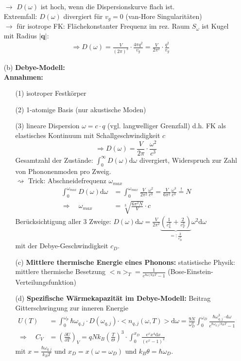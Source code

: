 \begin{itemize}
$\rightarrow$ $D(\omega)$ ist hoch, wenn die Dispersionskurve flach ist.\\
Extremfall: $D(\omega)$ divergiert für $v_g = 0$ (van-Hore Singularitäten)\\
$\rightarrow$ für isotrope FK: Flächekonstanter Frequenz im rez. Raum $S_{\omega}$ ist Kugel mit Radius $|\textbf{q}|$:
\begin{align}
	\Rightarrow D(\omega) = \frac{V}{(2\pi)^3} \cdot \frac{4\pi q^2}{v_g} = \frac{V}{2\pi^2} \cdot \frac{q^2}{v_g}
\end{align}
\item[(b)] \textbf{Debye-Modell:}\\
\textbf{Annahmen:} \begin{itemize}
	\item[(1)] isotroper Festkörper
	\item[(2)] 1-atomige Basis (nur akustische Moden)
	\item[(3)] lineare Dispersion $\omega = c \cdot q$ (vgl. langwelliger Grenzfall) d.h. FK als elastisches Kontinuum mit Schallgeschwindigkeit $c$
	$$\Rightarrow D(\omega) = \frac{V}{2 \pi} \cdot \frac{\omega^2}{c^3}$$
	Gesamtzahl der Zustände: $\int_0^\infty D(\omega)\mathrm{d}\omega$ divergiert, Widerspruch zur Zahl von Phononenmoden pro Zweig. \\
	$\rightsquigarrow$ Trick: Abschneidefrequenz $\omega_{max}$\\
	\begin{align*}
		\int_0^{\omega_{max}} D(\omega)\mathrm{d}\omega &= \int_0^{\omega_{max}} \frac{V}{2 \pi^2} \frac{\omega^2}{c^3} = \frac{V}{6 \pi^2} \frac{\omega^3}{c^3} \overset{!}{=} N\\
		\Rightarrow \quad \omega_{max} &= \sqrt[3]{\frac{6 \pi^2 N}{V}} \cdot c
	\end{align*}
	Berücksichtigung aller 3 Zweige: $D(\omega)\mathrm{d}\omega = \frac{V}{2\pi^2} \underbrace{\left(\frac{1}{c_L^3} + \frac{2}{c_T^3}\right)}_{=: \frac{3}{c_D^3}} \omega^2\mathrm{d}\omega$\\
	mit der Debye-Geschwindigkeit $c_D$.

\item[(c)]\textbf{Mittlere thermische Energie eines Phonons:}
	statistische Physik: mittlere thermische Besetzung $<n>_T = \frac{1}{e^{\hbar\omega/k_BT}-1}$ (Bose-Einstein-Verteilungsfunktion)

\item[(d)]\textbf{Spezifische Wärmekapazität im Debye-Modell:}
	Beitrag Gitterschwingung zur inneren Energie
	\begin{align}
		U(T) &= \int_0^{\omega_p} \hbar\omega_{q,j} \cdot D(\omega_{q,j}) \cdot <n_{q,j}(\omega,T)> \mathrm{d}\omega = \frac{9N}{\omega_D^3} \int_0^{\omega_D} \frac{\hbar\omega_{q,j}^3\cdot\mathrm{d}\omega}{e^{\hbar\omega_{q,j}/k_BT}-1} \\
		\Rightarrow \quad C_V &= \left(\frac{\partial U}{\partial T}\right)_V = q N k_B \left(\frac{T}{\Theta}\right)^3 \cdot \int_0^{x_D} \frac{e^x x^4 \mathrm{d}x}{(e^x-1)^2}
	\end{align}
	mit $x = \frac{\hbar\omega_{q,j}}{k_BT}$ und $x_D = x(\omega=\omega_D)$ und $k_B\theta = \hbar\omega_D$.


\end{itemize}
\end{itemize}
